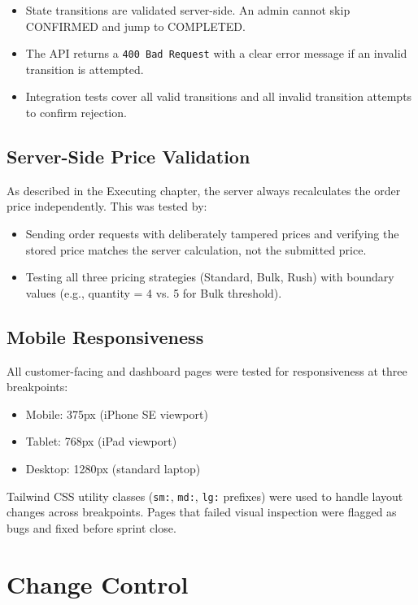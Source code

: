 \documentclass[12pt,a4paper]{report}
\begin{document}
\begin{itemize}
  \item State transitions are validated server-side. An admin cannot skip CONFIRMED and jump to COMPLETED.
  \item The API returns a \texttt{400 Bad Request} with a clear error message if an invalid transition is attempted.
  \item Integration tests cover all valid transitions and all invalid transition attempts to confirm rejection.
\end{itemize}

\subsection{Server-Side Price Validation}

As described in the Executing chapter, the server always recalculates the order price independently. This was tested by:

\begin{itemize}
  \item Sending order requests with deliberately tampered prices and verifying the stored price matches the server calculation, not the submitted price.
  \item Testing all three pricing strategies (Standard, Bulk, Rush) with boundary values (e.g., quantity = 4 vs. 5 for Bulk threshold).
\end{itemize}

\subsection{Mobile Responsiveness}

All customer-facing and dashboard pages were tested for responsiveness at three breakpoints:
\begin{itemize}
  \item Mobile: 375px (iPhone SE viewport)
  \item Tablet: 768px (iPad viewport)
  \item Desktop: 1280px (standard laptop)
\end{itemize}

Tailwind CSS utility classes (\texttt{sm:}, \texttt{md:}, \texttt{lg:} prefixes) were used to handle layout changes across breakpoints. Pages that failed visual inspection were flagged as bugs and fixed before sprint close.

\section{Change Control}
\end{document}

